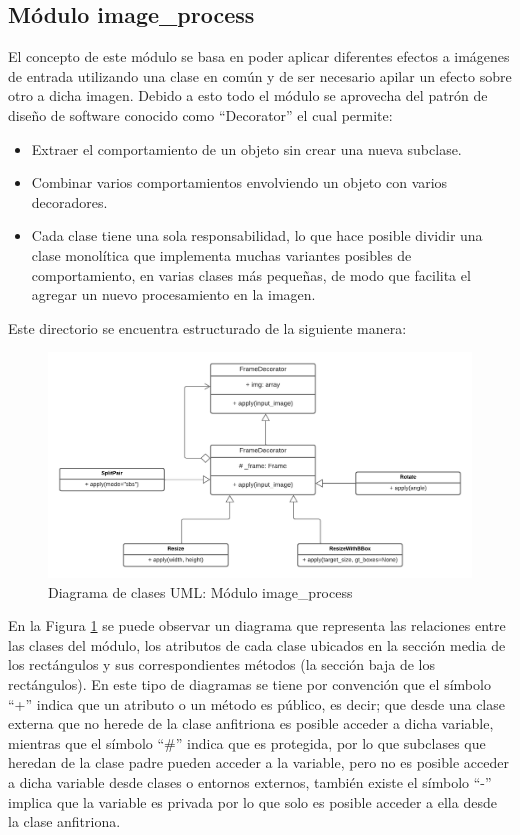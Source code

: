 \subsection{Módulo image\_process}
El concepto de este módulo se basa en poder aplicar diferentes efectos a imágenes de entrada utilizando una clase en común y de ser necesario apilar un efecto sobre otro a dicha imagen. Debido a esto todo el módulo se aprovecha del patrón de diseño de software conocido como ``Decorator'' el cual permite:
\begin{itemize}
    \item Extraer el comportamiento de un objeto sin crear una nueva subclase.
    \item Combinar varios comportamientos envolviendo un objeto con varios decoradores.
    \item Cada clase tiene una sola responsabilidad, lo que hace posible dividir una clase monolítica que implementa muchas variantes posibles de comportamiento, en varias clases más pequeñas, de modo que facilita el agregar un nuevo procesamiento en la imagen.
\end{itemize}
Este directorio se encuentra estructurado de la siguiente manera:
\begin{figure}[H]
    \centering
    \includegraphics[scale=0.4]{Recursos/image_process_uml.png}
    \caption{Diagrama de clases UML: Módulo image\_process}
    \label{image_process_uml}
\end{figure}
En la Figura \ref{image_process_uml} se puede observar un diagrama que representa las relaciones entre las clases del módulo, los atributos de cada clase ubicados en la sección media de los rectángulos y sus correspondientes métodos (la sección baja de los rectángulos). En este tipo de diagramas se tiene por convención que el símbolo ``+'' indica que un atributo o un método es público, es decir; que desde una clase externa que no herede de la clase anfitriona es posible acceder a dicha variable, mientras que el símbolo ``\#'' indica que es protegida, por lo que subclases que heredan de la clase padre pueden acceder a la variable, pero no es posible acceder a dicha variable desde clases o entornos externos, también existe el símbolo ``-'' implica que la variable es privada por lo que solo es posible acceder a ella desde la clase anfitriona.
